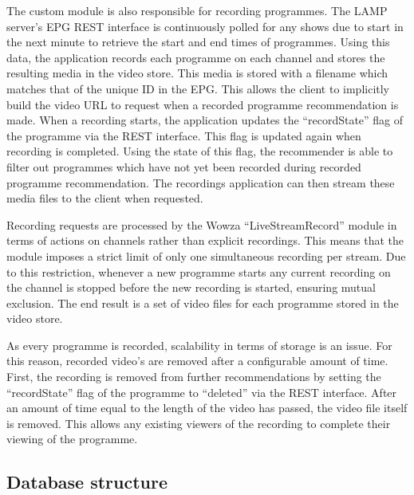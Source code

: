 The custom module is also responsible for recording programmes. The LAMP server's EPG REST interface is continuously polled for any shows due to start in the next minute to retrieve the start and end times of programmes. Using this data, the application records each programme on each channel and stores the resulting media in the video store. This media is stored with a filename which matches that of the unique ID in the EPG. This allows the client to implicitly build the video URL to request when a recorded programme recommendation is made. When a recording starts, the application updates the ``recordState'' flag of the programme via the REST interface. This flag is updated again when recording is completed. Using the state of this flag, the recommender is able to filter out programmes which have not yet been recorded during recorded programme recommendation. The recordings application can then stream these media files to the client when requested.

Recording requests are processed by the Wowza ``LiveStreamRecord'' module in terms of actions on channels rather than explicit recordings. This means that the module imposes a strict limit of only one simultaneous recording per stream. Due to this restriction, whenever a new programme starts any current recording on the channel is stopped before the new recording is started, ensuring mutual exclusion. The end result is a set of video files for each programme stored in the video store.

As every programme is recorded, scalability in terms of storage is an issue. For this reason, recorded video's are removed after a configurable amount of time. First, the recording is removed from further recommendations by setting the ``recordState'' flag of the programme to ``deleted'' via the REST interface. After an amount of time equal to the length of the video has passed, the video file itself is removed. This allows any existing viewers of the recording to complete their viewing of the programme.

\subsection{Database structure}

